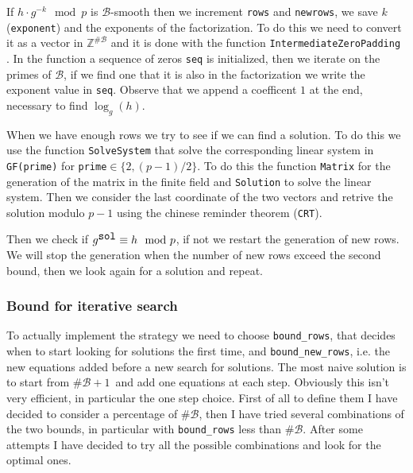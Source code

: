 \documentclass{article}
\newcommand{\ZZ}{\mathbb{Z}}
\newcommand{\BB}{\mathcal{B}}
\theoremstyle{plain}
\theoremstyle{remark}
\theoremstyle{definition}
\begin{document}
If $h\cdot g^{-k} \mod p$ is $\BB$-smooth then we increment \texttt{rows} and \texttt{newrows}, we save $k$ (\texttt{exponent}) and the exponents of the factorization. To do this we need to convert it as a vector in $\ZZ^{\#\BB}$ and it is done with the function \texttt{IntermediateZeroPadding} . In the function a sequence of zeros \texttt{seq} is initialized, then we iterate on the primes of $\BB$, if we find one that it is also in the factorization we write the exponent value in \texttt{seq}. Observe that we append a coefficent $1$ at the end, necessary to find $\log_g(h)$. 

When we have enough rows we try to see if we can find a solution. To do this we use the function \texttt{SolveSystem} that solve the corresponding linear system in \texttt{GF(prime)} for \texttt{prime}$\in \{2,(p-1)/2\}$. To do this the function \texttt{Matrix} for the generation of the matrix in the finite field and \texttt{Solution} to solve the linear system. Then we consider the last coordinate of the two vectors and retrive the solution modulo $p-1$ using the chinese reminder theorem (\texttt{CRT}). 

Then we check if $g^{\verb|sol|} \equiv h \mod p$, if not we restart the generation of new rows. We will stop the generation when the number of new rows exceed the second bound, then we look again for a solution and repeat.

\subsubsection{Bound for iterative search} \label{sssec:bounds}
To actually implement the strategy we need to choose \verb|bound_rows|, that decides when to start looking for solutions the first time, and \verb|bound_new_rows|, i.e. the new equations added before a new search for solutions. 
The most naive solution is to start from $\# \BB + 1$ and add one equations at each step. Obviously this isn't very efficient, in particular the one step choice. 
First of all to define them I have decided to consider a percentage of $\# \BB$, then I have tried several combinations of the two bounds, in particular with \verb|bound_rows| less than $\# \BB$. After some attempts I have decided to try all the possible combinations and look for the optimal ones. 
\end{document}
